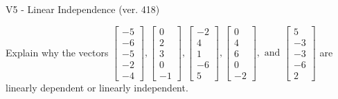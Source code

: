 \begin{exercise}
  \begin{exerciseTitle}V5 - Linear Independence (ver. 418)\end{exerciseTitle}
  \begin{exerciseStatement}
    Explain why the vectors \(\left[\begin{array}{r}
-5 \\
-6 \\
-5 \\
-2 \\
-4
\end{array}\right] , \left[\begin{array}{r}
0 \\
2 \\
3 \\
0 \\
-1
\end{array}\right] , \left[\begin{array}{r}
-2 \\
4 \\
1 \\
-6 \\
5
\end{array}\right] , \left[\begin{array}{r}
0 \\
4 \\
6 \\
0 \\
-2
\end{array}\right] , \text{ and } \left[\begin{array}{r}
5 \\
-3 \\
-3 \\
-6 \\
2
\end{array}\right]\) are linearly dependent or linearly independent.	



\end{exerciseStatement}
\end{exercise}
